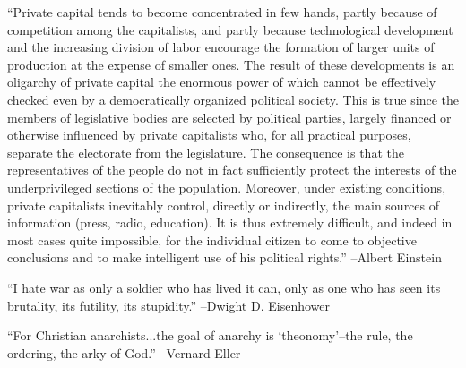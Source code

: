 \documentclass{article}%
\begin{document}
\linebreak%
\vspace{1mm}%
\begin{minipage}{\textwidth}%
\flushleft%
“Private capital tends to become concentrated in few hands, partly because of competition among the capitalists, and partly because technological development and the increasing division of labor encourage the formation of larger units of production at the expense of smaller ones. The result of these developments is an oligarchy of private capital the enormous power of which cannot be effectively checked even by a democratically organized political society. This is true since the members of legislative bodies are selected by political parties, largely financed or otherwise influenced by private capitalists who, for all practical purposes, separate the electorate from the legislature. The consequence is that the representatives of the people do not in fact sufficiently protect the interests of the underprivileged sections of the population. Moreover, under existing conditions, private capitalists inevitably control, directly or indirectly, the main sources of information (press, radio, education). It is thus extremely difficult, and indeed in most cases quite impossible, for the individual citizen to come to objective conclusions and to make intelligent use of his political rights.”%
\linebreak%
\vspace{1mm}%
–Albert Einstein%
\linebreak%
\vspace{1mm}%
\end{minipage}%
\linebreak%
\vspace{1mm}%
\begin{minipage}{\textwidth}%
\flushleft%
“I hate war as only a soldier who has lived it can, only as one who has seen its brutality, its futility, its stupidity.”%
\linebreak%
\vspace{1mm}%
–Dwight D. Eisenhower%
\linebreak%
\vspace{1mm}%
\end{minipage}%
\linebreak%
\vspace{1mm}%
\begin{minipage}{\textwidth}%
\flushleft%
“For Christian anarchists...the goal of anarchy is ‘theonomy’–the rule, the ordering, the arky of God.”%
\linebreak%
\vspace{1mm}%
–Vernard Eller%
\linebreak%
\vspace{1mm}%
\end{minipage}%
\end{document}
